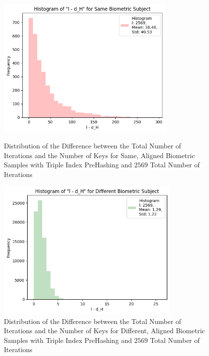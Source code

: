 \begin{enumerate}
\begin{itemize}
            \begin{figure}[H]
                \centering
                \begin{minipage}[b]{0.48\linewidth}
                    \centering
                    \includegraphics[width=\linewidth,height=7cm,keepaspectratio]{latex-img/l-dHconfig3_same.png}
                    \caption{Distribution of the Difference between the Total Number of Iterations and the Number of Keys for Same, Aligned Biometric Samples with Triple Index PreHashing and $2569$ Total Number of Iterations}
                    \label{l-dHconfig3_same}
                \end{minipage}
                \hfill
                \begin{minipage}[b]{0.48\linewidth}
                    \centering
                    \includegraphics[width=\linewidth,height=7cm,keepaspectratio]{latex-img/l-dHconfig3_diff.png}
                    \caption{Distribution of the Difference between the Total Number of Iterations and the Number of Keys for Different, Aligned Biometric Samples with Triple Index PreHashing and $2569$ Total Number of Iterations}
                    \label{l-dHconfig3_diff}
                \end{minipage}
            \end{figure}


\end{itemize}
\end{enumerate}
